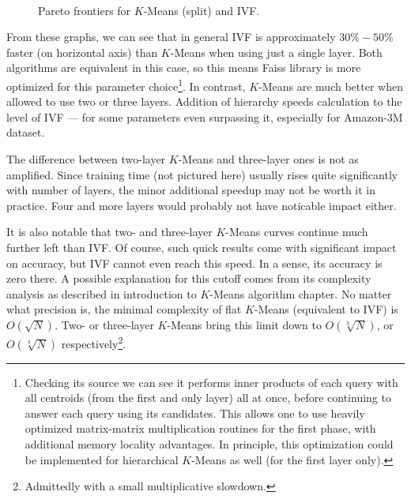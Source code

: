 \begin{figure}
	\centering
	\\
	\caption{Pareto frontiers for $K$-Means (split) and IVF.}
\end{figure}

From these graphs, we can see that in general IVF is approximately $30\% - 50\%$ faster
(on horizontal axis) than $K$-Means when using just a single layer. Both algorithms are
equivalent in this case, so this means Faiss library is more optimized for this parameter 
choice\footnote{
Checking its source we can see it performs inner products of each query with all centroids
(from the first and only layer) all at once, before continuing to answer each query 
using its candidates. This allows one to use heavily optimized matrix-matrix multiplication
routines for the first phase, with additional memory locality advantages. 
In principle, this optimization
could be implemented for hierarchical $K$-Means as well (for the first layer only).
}.
In contrast, $K$-Means are much better when allowed to use two or three layers. Addition
of hierarchy speeds calculation to the level of IVF --- for some parameters even surpassing
it, especially for Amazon-3M dataset.

The difference between two-layer $K$-Means and three-layer ones is not as amplified. Since
training time (not pictured here) usually rises quite significantly with number of layers,
the minor additional speedup may not be worth it in practice. Four and more layers
would probably not have noticable impact either.

It is also notable that two- and three-layer $K$-Means curves continue much further left
than IVF. Of course, such quick results come with significant impact on accuracy, but
IVF cannot even reach this speed. In a sense, its accuracy is zero there.
A possible explanation for this cutoff comes from its complexity analysis as described
in introduction to $K$-Means algorithm chapter. No matter what precision is, the minimal
complexity of flat $K$-Means (equivalent to IVF) is $O(\sqrt{N})$. Two- or three-layer
$K$-Means bring this limit down to $O(\sqrt[3]{N})$, or $O(\sqrt[4]{N})$
respectively\footnote{Admittedly with a small multiplicative slowdown.}.


